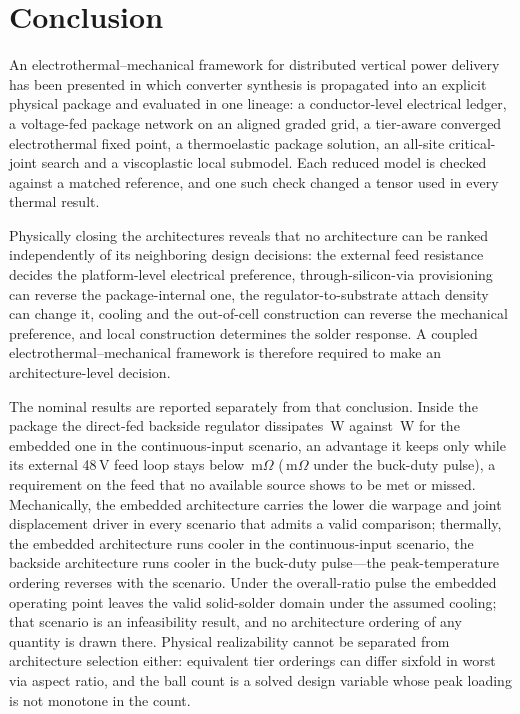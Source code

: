 \documentclass[journal]{IEEEtran}
\begin{document}
\section{Conclusion}\label{sec:concl}

An electrothermal--mechanical framework for distributed vertical power delivery has been
presented in which converter synthesis is propagated into an explicit physical package and
evaluated in one lineage: a conductor-level electrical ledger, a voltage-fed package network on
an aligned graded grid, a tier-aware converged electrothermal fixed point, a thermoelastic package
solution, an all-site critical-joint search and a viscoplastic local submodel. Each reduced model
is checked against a matched reference, and one such check changed a tensor used in every
thermal result.

Physically closing the architectures reveals that no architecture can be ranked independently of its neighboring design decisions: the external feed resistance decides the platform-level electrical preference, through-silicon-via provisioning can reverse the package-internal one, the regulator-to-substrate attach density can change it, cooling and the out-of-cell construction can reverse the mechanical preference, and local construction determines the solder response. A coupled electrothermal--mechanical framework is therefore required to make an architecture-level decision.

The nominal results are reported separately from that conclusion. Inside the package the direct-fed backside regulator dissipates \PlossZtwo\,W against \PlossZone\,W for the embedded one in the continuous-input scenario, an advantage it keeps only while its external 48\,V feed loop stays below \RstarSzero\,m$\Omega$ (\RstarSone\,m$\Omega$ under the buck-duty pulse), a requirement on the feed that no available source shows to be met or missed. Mechanically, the embedded architecture carries the lower die warpage and joint displacement driver in every scenario that admits a valid comparison; thermally,
the embedded architecture runs cooler in the continuous-input scenario, the backside architecture runs cooler in the buck-duty pulse---the peak-temperature ordering reverses with the scenario. Under the overall-ratio pulse the embedded operating point leaves the valid solid-solder domain under the assumed cooling; that scenario is an infeasibility result, and no architecture ordering of any quantity is drawn there. Physical realizability cannot be separated from architecture
selection either: equivalent tier orderings can differ sixfold in worst via aspect ratio, and the
ball count is a solved design variable whose peak loading is not monotone in the count.
\end{document}
